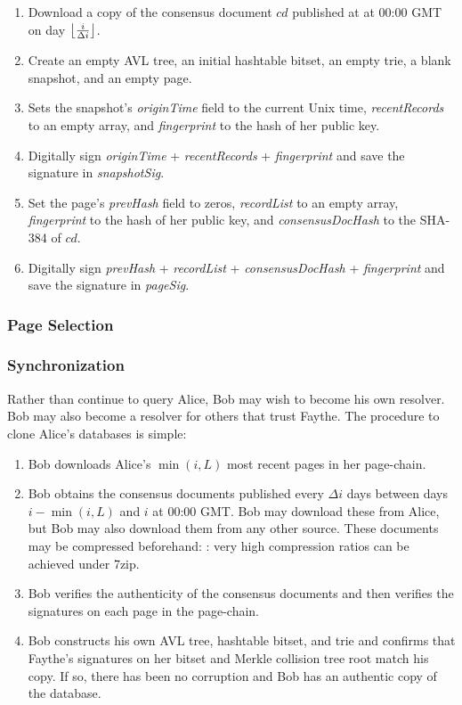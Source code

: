 \begin{enumerate}
	\item Download a copy of the consensus document $ cd $ published at at 00:00 GMT on day $ \floor[\big]{\frac{i}{\Delta i}} $.
	\item Create an empty AVL tree, an initial hashtable bitset, an empty trie, a blank snapshot, and an empty page.
	\item Sets the snapshot's \emph{originTime} field to the current Unix time, \emph{recentRecords} to an empty array, and \emph{fingerprint} to the hash of her public key.
	\item Digitally sign {\emph{originTime} + \emph{recentRecords} + \emph{fingerprint}} and save the signature in \emph{snapshotSig}.
	\item Set the page's \emph{prevHash} field to zeros, \emph{recordList} to an empty array, \emph{fingerprint} to the hash of her public key, and \emph{consensusDocHash} to the SHA-384 of $ cd $.
	\item Digitally sign {\emph{prevHash} + \emph{recordList} + \emph{consensusDocHash} + \emph{fingerprint}} and save the signature in \emph{pageSig}.
\end{enumerate}

\subsubsection{Page Selection}

\subsubsection{Synchronization}
\label{sec:Synchronization}

Rather than continue to query Alice, Bob may wish to become his own resolver. Bob may also become a resolver for others that trust Faythe. The procedure to clone Alice's databases is simple:

\begin{enumerate}
	\item Bob downloads Alice's $ \min(i,L) $ most recent pages in her page-chain.
	\item Bob obtains the consensus documents published every $ \Delta i $ days between days $ i - \min(i,L) $ and $ i $ at 00:00 GMT. Bob may download these from Alice, but Bob may also download them from any other source. These documents may be compressed beforehand: : very high compression ratios can be achieved under 7zip.
	\item Bob verifies the authenticity of the consensus documents and then verifies the signatures on each page in the page-chain.
	\item Bob constructs his own AVL tree, hashtable bitset, and trie and confirms that Faythe's signatures on her bitset and Merkle collision tree root match his copy. If so, there has been no corruption and Bob has an authentic copy of the database.
\end{enumerate}

